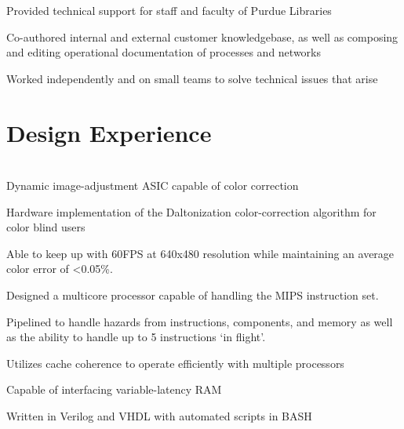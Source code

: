 \documentclass[letterpaper]{deedy-resume} %
\begin{document}
\begin{minipage}[t]{0.66\textwidth}
\sectionspace %





\begin{tightitemize}
\item Provided technical support for staff and faculty of Purdue Libraries
\item Co-authored internal and external customer knowledgebase, as well as composing and editing operational documentation of processes and networks
\item Worked independently and on small teams to solve technical issues that arise
\end{tightitemize}





\section{Design Experience}

 \\
Dynamic image-adjustment ASIC capable of color correction
\begin{tightitemize}
\item Hardware implementation of the Daltonization color-correction algorithm for color blind users
\item Able to keep up with 60FPS at 640x480 resolution while maintaining an average color error of <0.05\%.
\end{tightitemize}

\sectionspace %


\descript{}

Designed a multicore processor capable of handling the MIPS instruction set. 
\begin{tightitemize}
\item Pipelined to handle hazards from instructions, components, and memory as well as the ability to handle up to 5 instructions ‘in flight’.
\item Utilizes cache coherence to operate efficiently with multiple processors
\item Capable of interfacing variable-latency RAM
\item Written in Verilog and VHDL with automated scripts in BASH
\end{tightitemize}




\end{minipage}
\end{document}
